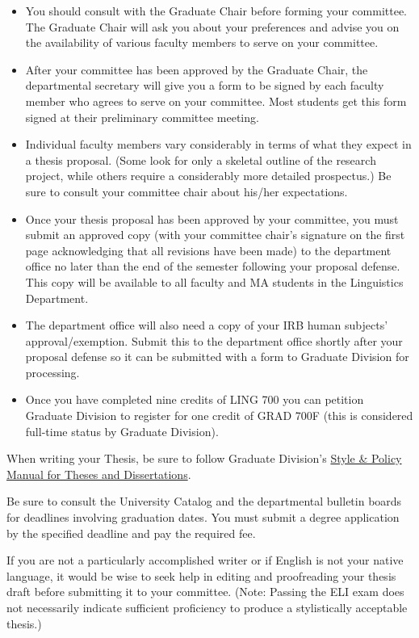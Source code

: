 \documentclass[
]{book}
\begin{document}
\begin{itemize}
\item
  You should consult with the Graduate Chair before forming your committee. The Graduate Chair will ask you about your preferences and advise you on the availability of various faculty members to serve on your committee.
\item
  After your committee has been approved by the Graduate Chair, the departmental secretary will give you a form to be signed by each faculty member who agrees to serve on your committee. Most students get this form signed at their preliminary committee meeting.
\item
  Individual faculty members vary considerably in terms of what they expect in a thesis proposal. (Some look for only a skeletal outline of the research project, while others require a considerably more detailed prospectus.) Be sure to consult your committee chair about his/her expectations.
\item
  Once your thesis proposal has been approved by your committee, you must submit an approved copy (with your committee chair's signature on the first page acknowledging that all revisions have been made) to the department office no later than the end of the semester following your proposal defense. This copy will be available to all faculty and MA students in the Linguistics Department.
\item
  The department office will also need a copy of your IRB human subjects' approval/exemption. Submit this to the department office shortly after your proposal defense so it can be submitted with a form to Graduate Division for processing.
\item
  Once you have completed nine credits of LING 700 you can petition Graduate Division to register for one credit of GRAD 700F (this is considered full-time status by Graduate Division).
\end{itemize}

When writing your Thesis, be sure to follow Graduate Division's \href{https://manoa.hawaii.edu/graduate/style-policy/}{Style \& Policy Manual for Theses and Dissertations}.

Be sure to consult the University Catalog and the departmental bulletin boards for deadlines involving graduation dates. You must submit a degree application by the specified deadline and pay the required fee.

If you are not a particularly accomplished writer or if English is not your native language, it would be wise to seek help in editing and proofreading your thesis draft before submitting it to your committee. (Note: Passing the ELI exam does not necessarily indicate sufficient proficiency to produce a stylistically acceptable thesis.)
\end{document}
